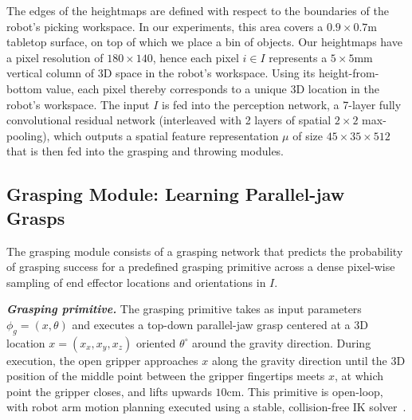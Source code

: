 \documentclass[journal]{IEEEtran}
\newcommand{\ie}{\textit{i}.\textit{e}., }
\newcommand{\mypara}[1]{\par\vspace*{0.8mm}\noindent\textbf{\textit{#1}}}
\begin{document}
The edges of the heightmaps are defined with respect to the boundaries of the robot's picking workspace. In our experiments, this area covers a $0.9\times0.7$m tabletop surface, on top of which we place a bin of objects. Our heightmaps have a pixel resolution of $180\times140$, hence each pixel $i\in{I}$ represents a $5\times5$mm vertical column of 3D space in the robot's workspace. Using its height-from-bottom value, each pixel thereby corresponds to a unique 3D location in the robot's workspace. The input $I$ is fed into the perception network, a 7-layer fully convolutional residual network \cite{badrinarayanan2015segnet,he2016deep,long2015fully} (interleaved with 2 layers of spatial $2\times2$ max-pooling), which outputs a spatial feature representation $\mu$ of size $45\times35\times512$ that is then fed into the grasping and throwing modules. 


\subsection{Grasping Module: Learning Parallel-jaw Grasps}
\label{sec:grasping}

The grasping module consists of a grasping network that predicts the probability of grasping success for a predefined grasping primitive across a dense pixel-wise sampling of end effector locations and orientations in $I$. %

\mypara{Grasping primitive.} The grasping primitive takes as input parameters $\phi_{g}=(x,\theta)$ and executes a top-down parallel-jaw grasp centered at a 3D location $x=(x_x,x_y,x_z)$ oriented $\theta^\circ$ around the gravity direction. During execution, the open gripper approaches $x$ along the gravity direction until the 3D position of the middle point between the gripper fingertips meets $x$, at which point the gripper closes, and lifts upwards $10$cm. This primitive is open-loop, with robot arm motion planning executed using a stable, collision-free IK solver~\cite{diankov_thesis}.
\end{document}
